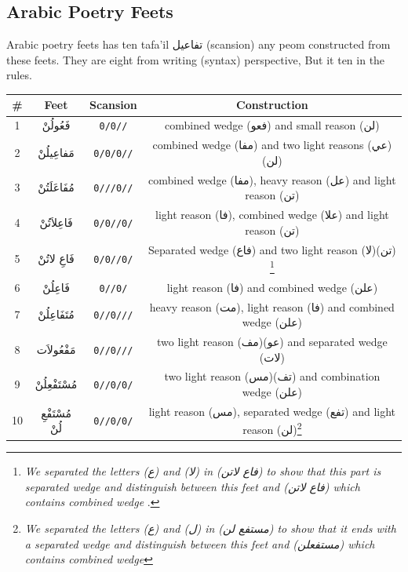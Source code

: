 \subsection{Arabic Poetry Feets}

Arabic poetry feets has ten tafa'il \textarabic{تفاعيل} (scansion)  any peom constructed from these feets. They are eight from writing (syntax) perspective, But it ten in the rules.
\begin{savenotes}

\begin{table}[H]
  \centering
  \begin{tabular}{|c|c|c|c|}
    \hline
    \textbf{\#} & \textbf{Feet} & \textbf{Scansion} & \textbf{Construction} \\
    \hline
    1 & \textarabic{فَعُولُنْ}  & \texttt{0/0//} & combined wedge (\textarabic{فعو}) and small reason (\textarabic{لن})   \\
    2 &\textarabic{مَفاعِيلُنْ}& \texttt{0/0/0//} & combined wedge (\textarabic{مفا}) and two light reasons (\textarabic{عي}) (\textarabic{لن})   \\
    3 &\textarabic{مُفَاعَلَتُنْ}& \texttt{0///0//}  &    combined wedge (\textarabic{مفا}), heavy reason (\textarabic{عل}) and light reason (\textarabic{تن}) \\
    4 &\textarabic{فَاعِلاَتُنْ} & \texttt{0/0//0/}   & light reason (\textarabic{فا}), combined wedge (\textarabic{علا}) and light reason (\textarabic{تن})   \\
    5 &\textarabic{فَاعِ لاتُنْ} & \texttt{0/0//0/}  &  Separated wedge (\textarabic{فاع}) and two light reason (\textarabic{لا})(\textarabic{تن}) \footnote{\textit{We separated the letters (\textarabic{ع}) and (\textarabic{لا}) in (\textarabic{فاع لاتن}) to show that this part is separated wedge and distinguish between this feet  and (\textarabic{فاع لاتن}) which contains combined wedge  }.}  \\
    6 &\textarabic{فَاعِلُنْ}  & \texttt{0//0/}   & light reason (\textarabic{فا}) and combined wedge (\textarabic{علن})\\
    7 &\textarabic{مُتَفَاعِلُنْ}& \texttt{0//0///}  & heavy reason (\textarabic{مت}), light reason (\textarabic{فا}) and combined wedge (\textarabic{علن})  \\
    8 &\textarabic{مَفْعُولاَت} & \texttt{0//0///}   & two light reason (\textarabic{مف})(\textarabic{عو}) and separated wedge (\textarabic{لات}) \\
    9 &\textarabic{مُسْتَفْعِلُنْ} & \texttt{0//0/0/}  &  two light reason (\textarabic{مس})(\textarabic{تف}) and combination wedge (\textarabic{علن}) \\
    10 &\textarabic{مُسْتَفْعِ لُنْ} & \texttt{0//0/0/}  & light reason (\textarabic{مس}), separated wedge  (\textarabic{تفع}) and light reason  (\textarabic{لن})\footnote{\textit{We separated the letters (\textarabic{ع}) and (\textarabic{ل}) in (\textarabic{مستفع لن}) to show that it ends with a separated wedge and distinguish between this feet  and (\textarabic{مستفعلن}) which contains combined wedge }}\\



\end{tabular}
\end{table}
\end{savenotes}

